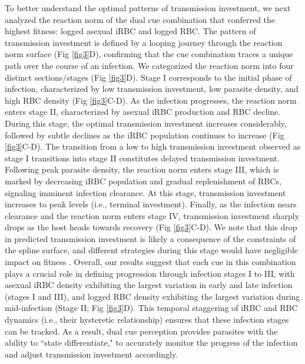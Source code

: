 \documentclass[10pt,letterpaper]{article}
\begin{document}
To better understand the optimal patterns of transmission investment, we next analyzed the reaction norm of the dual cue combination that conferred the highest fitness: logged asexual iRBC and logged RBC. The pattern of transmission investment is defined by a looping journey through the reaction norm surface (Fig \ref{fig3}D), confirming that the cue combination traces a unique path over the course of an infection. We categorized the reaction norm into four distinct sections/stages (Fig \ref{fig3}D). Stage I corresponds to the initial phase of infection, characterized by low transmission investment, low parasite density, and high RBC density (Fig \ref{fig3}C-D). As the infection progresses, the reaction norm enters stage II, characterized by asexual iRBC production and RBC decline. During this stage, the optimal transmission investment increases considerably, followed by subtle declines as the iRBC population continues to increase (Fig \ref{fig3}C-D). The transition from a low to high transmission investment observed as stage I transitions into stage II constitutes delayed transmission investment. Following peak parasite density, the reaction norm enters stage III, which is marked by decreasing iRBC population and gradual replenishment of RBCs, signaling imminent infection clearance. At this stage, transmission investment increases to peak levels (i.e., terminal investment). Finally, as the infection nears clearance and the reaction norm enters stage IV, transmission investment sharply drops as the host heads towards recovery (Fig \ref{fig3}C-D). We note that this drop in predicted transmission investment is likely a consequence of the constraints of the spline surface, and different strategies during this stage would have negligible impact on fitness \cite{greischar_predicting_2016}. Overall, our results suggest that each cue in this combination plays a crucial role in defining progression through infection stages I to III, with asexual iRBC density exhibiting the largest variation in early and late infection (stages I and III), and logged RBC density exhibiting the largest variation during mid-infection (Stage II; Fig \ref{fig3}D). This temporal staggering of iRBC and RBC dynamics (i.e., their hysteretic relationship) ensures that these infection stages can be tracked. As a result, dual cue perception provides parasites with the ability to ``state differentiate," to accurately monitor the progress of the infection and adjust transmission investment accordingly.\newline
\end{document}
